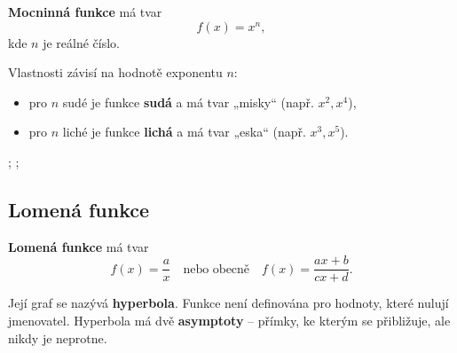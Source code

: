 \documentclass[12pt,a4paper]{article}
\begin{document}
\begin{definitionbox}
\textbf{Mocninná funkce} má tvar
\[
f(x) = x^n,
\]
kde \(n\) je reálné číslo.
\end{definitionbox}

Vlastnosti závisí na hodnotě exponentu \(n\):
\begin{itemize}
  \item pro \(n\) sudé je funkce \textbf{sudá} a má tvar „misky“ (např. \(x^2, x^4\)),
  \item pro \(n\) liché je funkce \textbf{lichá} a má tvar „eska“ (např. \(x^3, x^5\)).
\end{itemize}

\begin{center}
\begin{axisgraph}[grid=none, xmin=-3, xmax=3, ymin=-3, ymax=3, title={Příklady mocninných funkcí}]
    ;
    ;
\end{axisgraph}
\end{center}


\subsection*{Lomená funkce}

\begin{definitionbox}
\textbf{Lomená funkce} má tvar
\[
f(x) = \frac{a}{x} \quad \text{nebo obecně} \quad f(x) = \frac{a x + b}{c x + d}.
\]
\end{definitionbox}

Její graf se nazývá \textbf{hyperbola}.  
Funkce není definována pro hodnoty, které nulují jmenovatel.  
Hyperbola má dvě \textbf{asymptoty} – přímky, ke kterým se přibližuje, ale nikdy je neprotne.
\end{document}
